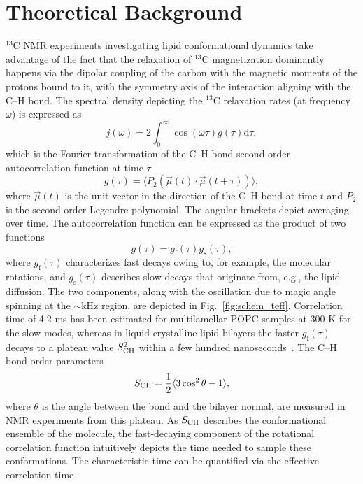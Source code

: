 \documentclass[journal=jpcbfk,manuscript=article,layout=twocolumn]{achemso}
\begin{document}
\section{Theoretical Background}\label{sec:theory}
$^{13}$C NMR experiments investigating lipid conformational dynamics take advantage of the fact that the relaxation of $^{13}$C magnetization dominantly happens via the dipolar coupling of the carbon with the magnetic moments of the protons bound to it, with the symmetry axis of the interaction aligning with the C--H bond. The spectral density depicting the $^{13}$C relaxation rates (at frequency $\omega$) is expressed as
\begin{equation}
j{(\omega)}=2\int_{0}^{\infty}\cos(\omega\tau)g(\tau)\mathrm d\tau ,
\end{equation}
which is the Fourier transformation of the C--H bond second order autocorrelation function at time $\tau$
\begin{equation}
\label{eq:BCF}
g(\tau)=\langle P_{2}\left(\vec{\mu}(t)\cdot \vec{\mu}(t+\tau)\right)\rangle ,
\end{equation}
where $\vec{\mu}(t)$ is the unit vector in the direction of the C--H bond at time $t$ and $P_{2}$ is the second order Legendre polynomial. The angular brackets depict averaging over time. The autocorrelation function can be expressed as the product of two functions
\begin{equation}
g(\tau)=g_{\mathrm{f}}(\tau)g_{\mathrm{s}}(\tau) ,
\end{equation} 
where $g_{\mathrm{f}}(\tau)$ characterizes fast decays owing to, for example, the molecular  rotations, and $g_{\mathrm{s}}(\tau)$ describes slow decays that originate from, e.g., the lipid diffusion. The two components, along with the oscillation due to magic angle spinning at the $\sim$kHz region, are depicted in Fig.~\ref{fig:schem_teff}. Correlation time of 4.2 ms has been estimated for multilamellar POPC samples at 300 K for the slow modes, whereas  in liquid crystalline lipid bilayers the faster $g_{\mathrm{f}}(\tau)$ decays to a plateau value $S^{2}_{\rm{CH}}$ within a few hundred nanoseconds~\cite{ferreira15}. The C--H bond order parameters
\begin{equation}
\label{eq:OP}
S_{\rm{CH}}=\frac{1}{2}\langle 3\cos^{2}\theta-1\rangle ,
\end{equation}
where $\theta$ is the angle between the bond and the bilayer normal, are measured in NMR experiments from this plateau. As $S_{\rm{CH}}$ describes the conformational ensemble of the molecule, the fast-decaying component of the rotational correlation function intuitively depicts the time needed to sample these conformations. The characteristic time can be quantified via the effective correlation time
\end{document}
